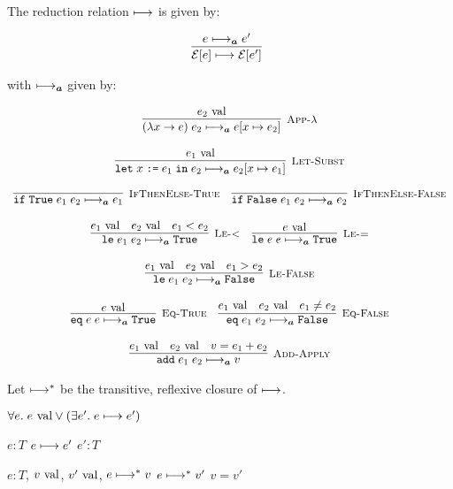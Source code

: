 \documentclass[10pt]{article}
\begin{document}
The reduction relation $\longmapsto$ is given by:

\[
  \begin{array}{c}
    \labinfer{\mathcal{E}[e] \reduces \mathcal{E}[e']}{e \reducesA e'}
  \end{array}
\]

with $\longmapsto_{\boldsymbol{a}}$ given by:

\[
  \begin{array}{cc}
    \labinfer[App-$\lambda$]{(\lambda x \ra e)\; e_2 \reducesA e[x\mapsto e_2]}{e_2 \val}
    \\\\
    \labinfer[Let-Subst]{\letbnd\; x\; \ttt{:=}\; e_1\; \inexpr\; e_2 \reducesA e_2[x\mapsto e_1]}{e_1 \val}
    \\\\
    \labinfer[IfThenElse-True]{\ite\; \True\; e_1\; e_2 \reducesA e_1}{}
    ~~~
    \labinfer[IfThenElse-False]{\ite\; \False\; e_1\; e_2 \reducesA e_2}{}
    \\\\
    \labinfer[Le-<]{\lesseq\; e_1\; e_2 \reducesA \True}{e_1 \val & e_2 \val & e_1 < e_2}
    ~~~
    \labinfer[Le-=]{\lesseq\; e\; e \reducesA \True}{e \val}
    \\\\
    \labinfer[Le-False]{\lesseq\; e_1\; e_2 \reducesA \False}{e_1 \val & e_2 \val & e_1 > e_2}
    \\\\
    \labinfer[Eq-True]{\eq\; e\; e \reducesA \True}{e \val}
    ~~~
    \labinfer[Eq-False]{\eq\; e_1\; e_2 \reducesA \False}{e_1 \val & e_2 \val & e_1 \neq e_2}
    \\\\
    \labinfer[Add-Apply]{\add\; e_1\; e_2 \reducesA v}{e_1 \val & e_2 \val & v = e_1 + e_2}

  \end{array}
\]

\noindent
Let $\longmapsto^{*}$ be the transitive, reflexive closure of $\longmapsto$.

\begin{theorem}[Progress]
  $\forall e.\; e \textnormal{ val} \lor (\exists e'.\; e \longmapsto e')$
\end{theorem}

\begin{theorem}[Preservation]
   $e : T$  $e \longmapsto e'$  $e' : T$
\end{theorem}

\begin{theorem}
   $e : T$, $v \textnormal{ val}$, $v' \textnormal{ val}$, $e \longmapsto^{*} v$  $e \longmapsto^{*} v'$  $v = v'$
\end{theorem}
\end{document}
